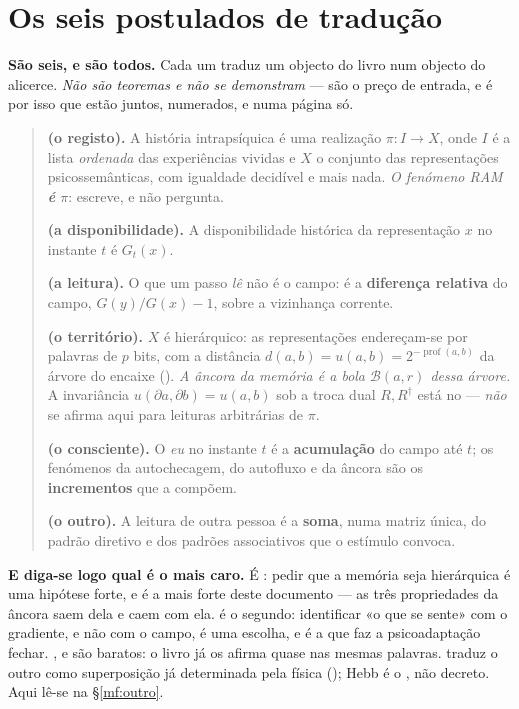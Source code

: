 \documentclass[../livro.tex]{subfiles}
\begin{document}
\section{Os seis postulados de tradução}\label{mf:postulados}

\noindent\textbf{São seis, e são todos.} Cada um traduz um objecto do livro num
objecto do alicerce. \emph{Não são teoremas e não se demonstram} --- são o preço
de entrada, e é por isso que estão juntos, numerados, e numa página só.

\begin{quote}\small
\textbf{ (o registo).} A história intrapsíquica é uma realização
$\pi\colon I\to X$, onde $I$ é a lista \emph{ordenada} das experiências
vividas e $X$ o conjunto das representações psicossemânticas, com igualdade
decidível e mais nada. \emph{O fenómeno RAM \textbf{é} $\pi$}: escreve, e não
pergunta.

\smallskip\textbf{ (a disponibilidade).} A disponibilidade histórica da
representação $x$ no instante $t$ é $G_t(x)$.

\smallskip\textbf{ (a leitura).} O que um passo \emph{lê} não é o campo: é
a \textbf{diferença relativa} do campo, $G(y)/G(x)-1$, sobre a vizinhança
corrente.

\smallskip\textbf{ (o território).} $X$ é hierárquico: as representações
endereçam-se por palavras de $p$ bits, com a distância
$d(a,b)=u(a,b)=2^{-\operatorname{prof}(a,b)}$ da árvore do encaixe
(). \emph{A âncora da memória é a bola $\mathcal{B}(a,r)$
dessa árvore.} A invariância $u(\partial a,\partial b)=u(a,b)$ sob a troca dual
$R,R^{\dagger}$ está no  --- \emph{não} se afirma aqui para leituras arbitrárias de $\pi$.

\smallskip\textbf{ (o consciente).} O \emph{eu} no instante $t$ é a
\textbf{acumulação} do campo até $t$; os fenómenos da autochecagem, do autofluxo
e da âncora são os \textbf{incrementos} que a compõem.

\smallskip\textbf{ (o outro).} A leitura de outra pessoa é a
\textbf{soma}, numa matriz única, do padrão diretivo e dos padrões associativos
que o estímulo convoca.
\end{quote}

\medskip\noindent\textbf{E diga-se logo qual é o mais caro.} É : pedir que
a memória seja hierárquica é uma hipótese forte, e é a mais forte deste
documento --- as três propriedades da âncora saem dela e caem com ela.  é
o segundo: identificar «o que se sente» com o gradiente, e não com o campo, é
uma escolha, e é a que faz a psicoadaptação fechar. ,  e  são
baratos: o livro já os afirma quase nas mesmas palavras.  traduz o outro
como superposição já determinada pela física (); Hebb é
o , não decreto. Aqui lê-se na §\ref{mf:outro}.
\end{document}
